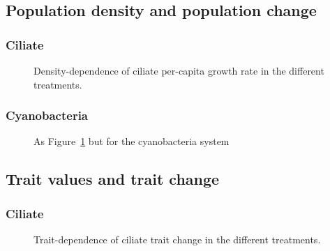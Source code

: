 \documentclass[
  letterpaper,
  DIV=11,
  numbers=noendperiod]{scrartcl}
\begin{document}
\subsection{Population density and population
change}\label{population-density-and-population-change}

\subsubsection{Ciliate}\label{ciliate-1}

\begin{figure}


\caption{\label{fig-cilia-pcgr}Density-dependence of ciliate per-capita
growth rate in the different treatments.}

\end{figure}%

\subsubsection{Cyanobacteria}\label{cyanobacteria-1}

\begin{figure}


\caption{\label{fig-cyano-pcgr}As Figure~\ref{fig-cilia-pcgr} but for
the cyanobacteria system}

\end{figure}%

\subsection{Trait values and trait
change}\label{trait-values-and-trait-change}

\subsubsection{Ciliate}\label{ciliate-2}

\begin{figure}


\caption{\label{fig-cilia-dT}Trait-dependence of ciliate trait change in
the different treatments.}

\end{figure}%
\end{document}
